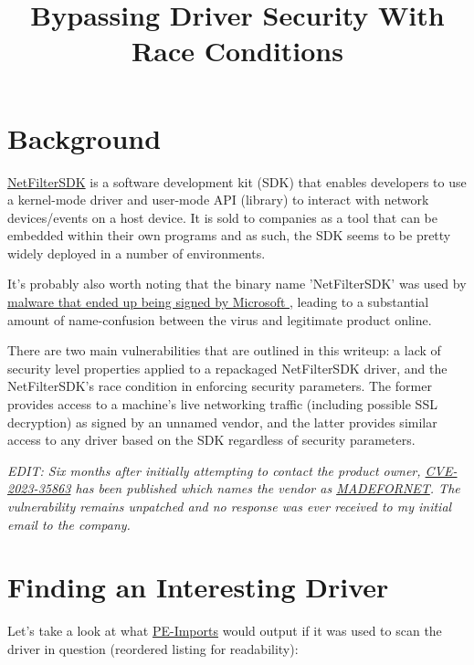 \title{Bypassing Driver Security With Race Conditions}

\section{Background}

\href{https://netfiltersdk.com/}{NetFilterSDK} is a software development kit (SDK) that enables developers to use a kernel-mode driver and
            user-mode API (library) to interact with network devices/events on a host device. It is sold to companies as a tool that
            can be embedded within their own programs and as such, the SDK seems to be pretty widely deployed in a number of environments.

It's probably also worth noting that the binary name 'NetFilterSDK' was used by
            \href{https://www.gdatasoftware.com/blog/microsoft-signed-a-malicious-netfilter-rootkit}{
                malware that ended up being signed by Microsoft
            }, leading to a substantial amount of name-confusion between the virus and legitimate product online.

There are two main vulnerabilities that are outlined in this writeup: a lack of security level properties applied to
            a repackaged NetFilterSDK driver, and the NetFilterSDK's race condition in enforcing security parameters.
            The former provides access to a machine's live networking traffic (including possible SSL decryption) as signed by an
            unnamed vendor, and the latter provides similar access to any driver based on the SDK regardless of security parameters.

\textit{
                EDIT: Six months after initially attempting to contact the product owner, \href{https://nvd.nist.gov/vuln/detail/CVE-2023-35863}{CVE-2023-35863}
                has been published which names the vendor as \href{https://madefornet.com/}{MADEFORNET}. The vulnerability
                remains unpatched and no response was ever received to my initial email to the company.
            }

\section{Finding an Interesting Driver}

Let's take a look at what \href{https://github.com/michaellrowley/PE-Imports}{PE-Imports} would output if it was used to
            scan the driver in question (reordered listing for readability):

